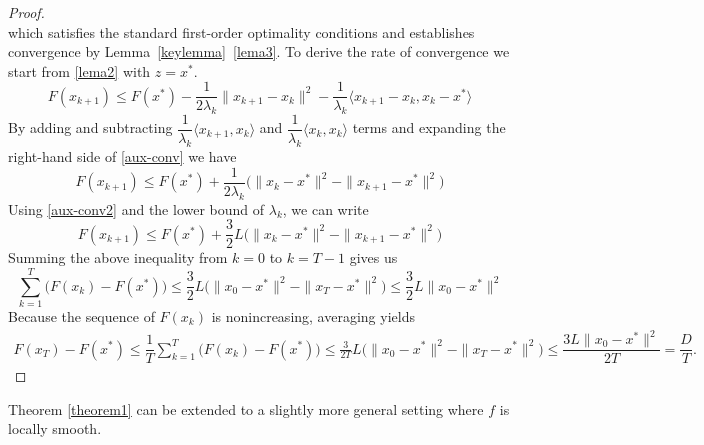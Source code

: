 \documentclass[11pt, a4paper, oneside, reqno]{amsart}
\begin{document}
\begin{proof}
{\begin{equation*}
\end{equation*}
which satisfies the standard first-order optimality conditions and establishes convergence by Lemma~\ref{keylemma}~\ref{lema3}.}
To derive the rate of convergence we start from \ref{lema2} with $z = x^*$.
\begin{equation}\label{aux-conv}
   F(x_{k+1}) \leq F(x^*) - \dfrac{1}{2\lambda_k} \|x_{k+1} - x_k\|^2 - \dfrac{1}{\lambda_k}\langle x_{k+1} - x_k, x_k -  x^* \rangle  
\end{equation}
By adding and subtracting $\dfrac{1}{\lambda_k} \langle x_{k+1}, x_k \rangle$ and $\dfrac{1}{\lambda_k} \langle x_k, x_k \rangle$ terms and expanding the right-hand side of \eqref{aux-conv} we have  
\begin{equation}\label{aux-conv2}
     F(x_{k+1}) \leq F(x^*) + \dfrac{1}{2\lambda_k}\Big(\|x_k - x^*\|^2 - \|x_{k+1} - x^*\|^2\Big)
\end{equation}
{\color{black} Using \eqref{aux-conv2} and the lower bound of $\lambda_k$, we can write
\begin{equation*}
    F(x_{k+1}) \leq F(x^*) + \frac{3}{2}L\Big(\|x_k - x^*\|^2 - \|x_{k+1} - x^*\|^2\Big)
\end{equation*}
Summing the above inequality from $k = 0$ to $k = T-1$ gives us
\begin{equation*}
    \sum_{k=1}^{T}\Big(F(x_k) - F(x^*)\Big) \leq \frac{3}{2}L\Big(\|x_0 - x^*\|^2 - \|x_T - x^*\|^2\Big) \leq \frac{3}{2}L\|x_0 - x^*\|^2
\end{equation*}
Because the sequence of $F(x_k)$ is nonincreasing, averaging yields
\begin{align*}
    F(x_T) - F(x^*) \leq \dfrac{1}{T}\sum_{k=1}^{T}\Big(F(x_k) - F(x^*)\Big) \leq \frac{3}{2T}L\Big(\|x_0 - x^*\|^2 - \|x_T - x^*\|^2\Big) \leq \dfrac{3L\|x_0 - x^*\|^2}{2T} = \dfrac{D}{T}.
\end{align*}}
\end{proof}
Theorem \ref{theorem1} can be extended to a slightly more general setting where $f$ is locally smooth.
\end{document}
